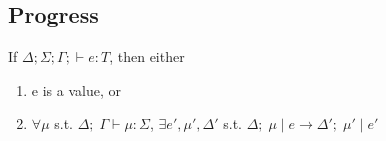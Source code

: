 \documentclass{llncs}
\begin{document}
\subsection{Progress}
\begin{theorem}[Progress]
If $\Delta; \Sigma; \Gamma;  \vdash e : T$, then either
\begin{enumerate}
\item e is a value, or
\item $\forall \mu$ s.t.
		   $\Delta; \; \Gamma \vdash \mu : \Sigma$,
         $\exists e', \mu', \Delta'$ s.t. 
         $\Delta; \; \mu \; | \; e \rightarrow \Delta'; \; \mu' \; | \; e'$
\end{enumerate}
\end{theorem}
\end{document}

